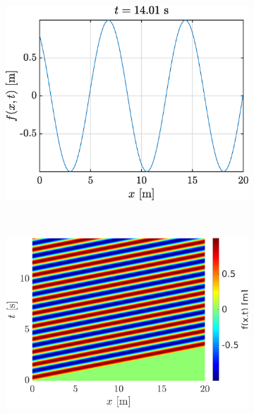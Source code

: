 \documentclass[a4paper,12pt,twoside]{article}
\begin{document}
    \begin{figure}[h!]
    \begin{subfigure}{0.5\textwidth}
    \includegraphics[width=\textwidth]{graphs/ex1fsortie.eps}
    \end{subfigure}
    ~
    \begin{subfigure}{0.55\textwidth}
    \includegraphics[width=\textwidth]{graphs/ex1xtsortie.eps}
    \end{subfigure}\


\end{figure}
\end{document}
